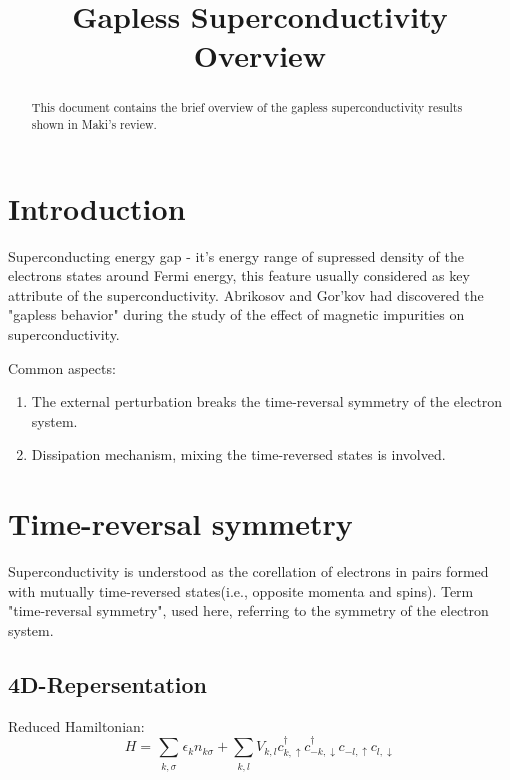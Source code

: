 \documentclass{article}
\begin{document}
\title{Gapless Superconductivity Overview}

\maketitle

\begin{abstract}
This document contains the brief overview of the gapless superconductivity results
shown in Maki's review.
\end{abstract}



\section{Introduction}

Superconducting energy gap - it's energy range of supressed density of the electrons
states around Fermi energy, this feature usually considered as key attribute of 
the superconductivity. Abrikosov and Gor'kov had discovered the "gapless behavior"
during the study of the effect of magnetic impurities on superconductivity.

Common aspects:
\begin{enumerate}
\item The external perturbation breaks the time-reversal symmetry of the electron system.
\item Dissipation mechanism, mixing the time-reversed states is involved.
\end{enumerate}

\section{Time-reversal symmetry}

Superconductivity is understood as the corellation of electrons in pairs formed with
mutually time-reversed states(i.e., opposite momenta and spins). Term "time-reversal
symmetry", used here, referring to the symmetry of the electron system.

\subsection {4D-Repersentation}

Reduced Hamiltonian:
\begin{equation}
   H=\sum_{\substack{
    k,\sigma
   }}
   \epsilon_k
   n_{k\sigma}
   +
   \sum_{\substack{
      k,l
    }}
    V_{k,l}
    c^{\dagger}_{k, \uparrow}
    c^{\dagger}_{-k, \downarrow}
    c_{-l, \uparrow}
    c_{l, \downarrow}
\end{equation}
\end{document}
